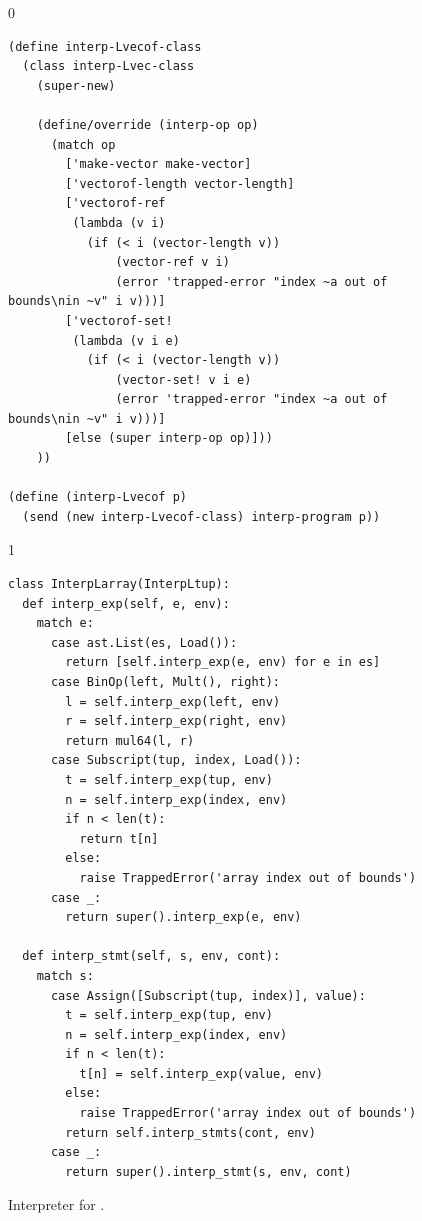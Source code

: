 \documentclass[7x10]{TimesAPriori_MIT}%
\def\racketEd{0}
\def\pythonEd{1}
\def\edition{1}
\newcommand{\pythonColor}[0]{}
\numberwithin{theorem}{chapter}
\numberwithin{definition}{chapter}
\numberwithin{equation}{chapter}
\begin{document}
\begin{figure}[tbp]
  \begin{tcolorbox}[colback=white]
{\if\edition\racketEd    
\begin{lstlisting}[basicstyle=\ttfamily\footnotesize]
(define interp-Lvecof-class
  (class interp-Lvec-class
    (super-new)

    (define/override (interp-op op)
      (match op
        ['make-vector make-vector]
        ['vectorof-length vector-length]
        ['vectorof-ref
         (lambda (v i)
           (if (< i (vector-length v))
               (vector-ref v i)
               (error 'trapped-error "index ~a out of bounds\nin ~v" i v)))]
        ['vectorof-set!
         (lambda (v i e)
           (if (< i (vector-length v))
               (vector-set! v i e)
               (error 'trapped-error "index ~a out of bounds\nin ~v" i v)))]
        [else (super interp-op op)]))
    ))

(define (interp-Lvecof p)
  (send (new interp-Lvecof-class) interp-program p))
\end{lstlisting}
    \fi}
{\if\edition\pythonEd\pythonColor
\begin{lstlisting}[basicstyle=\ttfamily\footnotesize]
class InterpLarray(InterpLtup):
  def interp_exp(self, e, env):
    match e:
      case ast.List(es, Load()):
        return [self.interp_exp(e, env) for e in es]
      case BinOp(left, Mult(), right):
        l = self.interp_exp(left, env)
        r = self.interp_exp(right, env)
        return mul64(l, r)
      case Subscript(tup, index, Load()):
        t = self.interp_exp(tup, env)
        n = self.interp_exp(index, env)
        if n < len(t):
          return t[n]
        else:
          raise TrappedError('array index out of bounds')
      case _:
        return super().interp_exp(e, env)

  def interp_stmt(self, s, env, cont):
    match s:
      case Assign([Subscript(tup, index)], value):
        t = self.interp_exp(tup, env)
        n = self.interp_exp(index, env)
        if n < len(t):
          t[n] = self.interp_exp(value, env)
        else:
          raise TrappedError('array index out of bounds')
        return self.interp_stmts(cont, env)
      case _:
        return super().interp_stmt(s, env, cont)
\end{lstlisting}
\fi}
  \end{tcolorbox}

  \caption{Interpreter for \LangArray{}.}
\label{fig:interp-Lvecof}
\end{figure}
\end{document}

